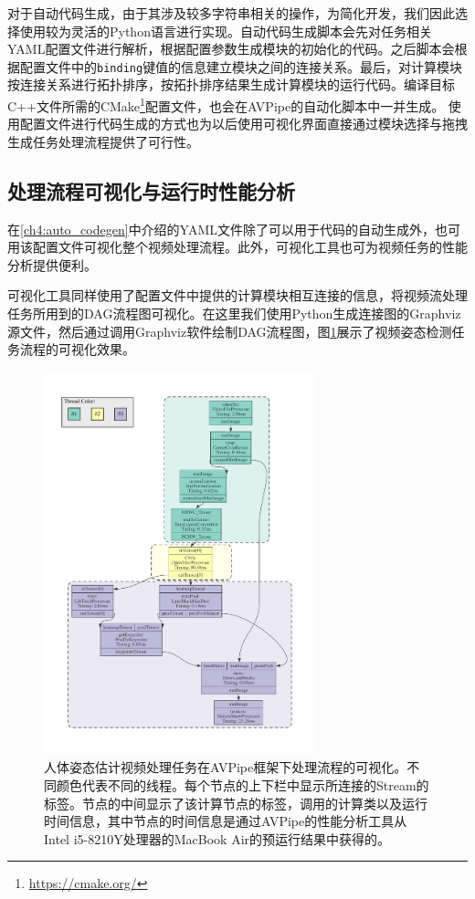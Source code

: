 对于自动代码生成，由于其涉及较多字符串相关的操作，为简化开发，我们因此选择使用较为灵活的Python语言进行实现。自动代码生成脚本会先对任务相关YAML配置文件进行解析，根据配置参数生成模块的初始化的代码。之后脚本会根据配置文件中的\texttt{binding}键值的信息建立模块之间的连接关系。最后，对计算模块按连接关系进行拓扑排序，按拓扑排序结果生成计算模块的运行代码。编译目标C++文件所需的CMake\footnote{\url{https://cmake.org/}}配置文件，也会在AVPipe的自动化脚本中一并生成。
使用配置文件进行代码生成的方式也为以后使用可视化界面直接通过模块选择与拖拽生成任务处理流程提供了可行性。

\subsection{处理流程可视化与运行时性能分析}\label{ch4:viz_prof}
在\ref{ch4:auto_codegen}中介绍的YAML文件除了可以用于代码的自动生成外，也可用该配置文件可视化整个视频处理流程。此外，可视化工具也可为视频任务的性能分析提供便利。\par

可视化工具同样使用了配置文件中提供的计算模块相互连接的信息，将视频流处理任务所用到的DAG流程图可视化。在这里我们使用Python生成连接图的Graphviz\cite{Gansner00anopen}源文件，然后通过调用Graphviz软件绘制DAG流程图，图\ref{fig:pose_dag}展示了视频姿态检测任务流程的可视化效果。\par

\begin{figure}[tb]
    \centering
    \includegraphics[width=0.7\textwidth]{figure/AVP_pose_estimation.pdf}
    \caption[AVPipe可视化DAG流程图的示例]{人体姿态估计视频处理任务在AVPipe框架下处理流程的可视化。不同颜色代表不同的线程。每个节点的上下栏中显示所连接的Stream的标签。节点的中间显示了该计算节点的标签，调用的计算类以及运行时间信息，其中节点的时间信息是通过AVPipe的性能分析工具从Intel i5-8210Y处理器的MacBook Air的预运行结果中获得的。}
    \label{fig:pose_dag}
\end{figure}

